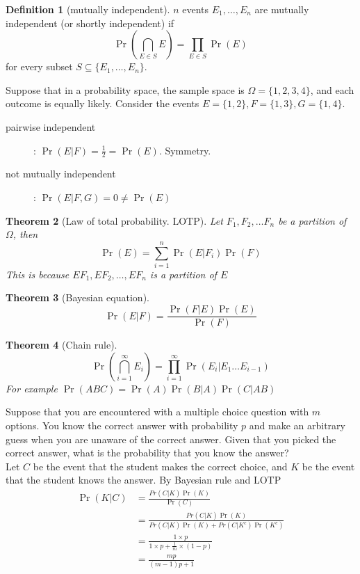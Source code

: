\documentclass{article}
\newtheorem{theorem}{Theorem}[section]
\theoremstyle{definition}
\newtheorem{definition}[theorem]{Definition}
\theoremstyle{remark}
\begin{document}
\begin{definition}[mutually independent]
	\(n\) events \(E_1,\ldots, E_n\) are mutually independent (or shortly independent) if
	\[
		\Pr\left(\bigcap_{E\in S} E\right) = \prod_{E\in S} \Pr(E)
	\]
	for every subset \(S\subseteq \{E_1,\ldots,E_n\}\).
\end{definition}


\begin{tcolorbox}[title=mutually independent and pairwise independent]
	Suppose that in a probability space, the sample space is \(\Omega = \{1,2,3,4\}\), and each outcome is equally likely.
	Consider the events \(E=\{1,2\}, F=\{1,3\}, G=\{1,4\}\).
	\begin{description}
		\item[pairwise independent]: \(\Pr(E|F) = \frac12 = \Pr(E)\). Symmetry.
		\item[not mutually independent]: \(\Pr(E|F,G) = 0 \neq \Pr(E)\)
	\end{description}
\end{tcolorbox}

\begin{theorem}[Law of total probability. LOTP]
	Let \(F_1,F_2,\ldots F_n\) be a partition of \(\Omega\), then
	\[
		\Pr(E) = \sum_{i=1}^{n} \Pr(E|F_i)\Pr(F)
	\]
	This is because \(EF_1, EF_2,\ldots, EF_n\) is a partition of \(E\)
\end{theorem}

\begin{theorem}[Bayesian equation]
	\[
		\Pr(E|F) = \frac{\Pr(F|E)\Pr(E)}{\Pr(F)}
	\]
\end{theorem}

\begin{theorem}[Chain rule]
	\[
		\Pr\left(\bigcap_{i=1}^\infty E_i \right) = \prod_{i=1}^\infty \Pr(E_i | E_1 \ldots E_{i-1})
	\]
	For example \(\Pr(ABC) = \Pr(A)\Pr(B|A)\Pr(C|AB)\)
\end{theorem}


\begin{tcolorbox}[title=multiple choice problem]
	Suppose that you are encountered with a multiple choice question with \(m\) options.
	You know the correct answer with probability \(p\) and make an arbitrary guess when you are unaware of the correct answer.
	Given that you picked the correct answer, what is the probability that you know the answer?\\

	Let \(C\) be the event that the student makes the correct choice,
	and \(K\) be the event that the student knows the answer.
	By Bayesian rule and LOTP
	\begin{align*}
		\Pr(K|C)
		 & = \frac{Pr(C|K)\Pr(K)}{\Pr(C)}                              \\
		 & = \frac{Pr(C|K)\Pr(K)}{ Pr(C|K)\Pr(K) + Pr(C|K^c)\Pr(K^c) } \\
		 & = \frac{1 \times p}{1\times p + \frac{1}{m}\times (1-p)}    \\
		 & = \frac{mp}{(m-1)p + 1}
	\end{align*}
\end{tcolorbox}
\end{document}
